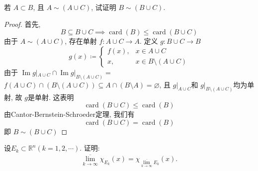 \documentclass[../main.tex]{subfiles}
\begin{document}
\begin{exercise}{}{}
    若 $A \subset B$, 且 $A \sim (A \cup C)$, 试证明 $B \sim (B \cup C)$.
\end{exercise}
\begin{proof}
    首先, \[
    B \subseteq B\cup C \implies \operatorname{card}\left( B \right)\le \operatorname{card}\left( B\cup C \right)  
    \]  由于 \(  A\sim \left( A\cup C \right)   \), 存在单射 \(  f:A\cup C\to A  \). 定义 \(  g:B\cup C\to B  \)  \[
    g\left( x \right) \coloneqq \begin{cases} f\left( x \right),& x \in A\cup C\\ 
     x,& x \in B\setminus \left( A\cup C \right)      \end{cases} 
    \]  由于 \(  \operatorname{Im}g|_{A\cup C}\cap \operatorname{Im}g|_{B\setminus \left( A\cup C \right) }=   \)  \(  f\left( A\cup C \right)\cap \left( B\setminus  \left( A\cup C \right)  \right)\subseteq A\cap \left( B\setminus A \right)= \varnothing     \), 且 \(  g|_{A\cup C}  \)和 \(  g|_{B\setminus  \left( A\cup C \right) }  \)均为单射, 故 \(  g  \)是单射.  这表明 \[
    \operatorname{card}\left( B\cup C \right)\le \operatorname{card}\left( B \right)  
    \] 由Cantor-Bernstein-Schroeder定理, 我们有 \[
    \operatorname{card}\left( B\cup C \right)= \operatorname{card}\left( B \right)  
    \]即 \(  B\sim \left( B\cup C \right)   \)  
\end{proof}
\begin{exercise}{}{}
  设$E_k \subset \mathbb{R}^n (k = 1, 2, \cdots)$. 证明:
\[\begin{aligned}
\overline{\lim_{k \to \infty}} \chi_{E_k}(x) = \chi_{\overline{\lim_{k \to \infty}} E_k}(x).
\end{aligned}\]
\end{exercise}
\end{document}

